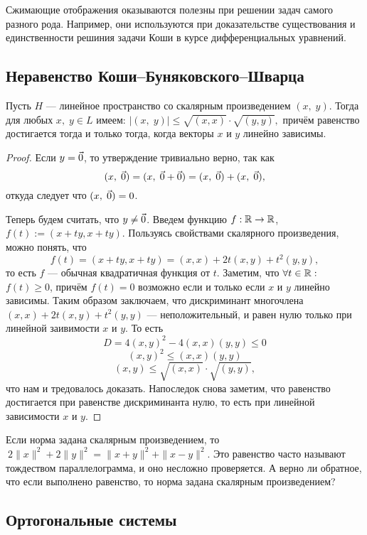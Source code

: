 Сжимающие отображения оказываются полезны при решении задач самого разного рода. Например, они используются при доказательстве существования и единственности решиния задачи Коши в курсе дифференциальных уравнений. 

\subsection{Неравенство Коши--Буняковского--Шварца}

\begin{Theorem}
	Пусть $H$ --- линейное пространство со скалярным произведением $(x,\;y)$.
	Тогда для любых $x,\;y\in L$ имеем: $|( x,\;y) | \leqslant  \sqrt{(x, x)}\cdot \sqrt{(y, y)},$ причём равенство достигается тогда и только тогда, когда векторы $x$ и $y$ линейно зависимы.
\end{Theorem}
\begin{proof}
	Если $y = \vec{0}$, то утверждение тривиально верно, так как $$ ( x,\;\vec{0}) = ( x,\;\vec{0}+\vec{0}) = ( x,\;\vec{0})+( x,\;\vec{0}),$$
	откуда следует что $( x,\;\vec{0}) = 0$.
	
	Теперь будем считать, что $y\neq \vec{0}$. Введем функцию $f: \mathbb{R} \rightarrow\mathbb{R}$, $f(t):=(x+ty, x+ty)$. Пользуясь свойствами скалярного произведения, можно понять, что 
    $$ f(t) =(x+ty, x+ty) = (x, x)+2t(x, y)+t^2(y, y),$$ 
    то есть $f$ --- обычная квадратичная функция от $t$. Заметим, что $\forall t\in\mathbb{R}:$ $f(t)\geq0$, причём $f(t)=0$ возможно если и только если $x$ и $y$ линейно зависимы. Таким образом заключаем, что дискриминант многочлена $(x, x)+2t(x, y)+t^2(y, y)$ --- неположительный, и равен нулю только при линейной заивимости $x$ и $y$. То есть 
	\[D = 4(x, y)^2-4(x, x)(y, y)\leq 0\]
	\[(x, y)^2\leq(x, x)(y, y)\]
	\[(x, y)\leq \sqrt{(x, x)}\cdot \sqrt{(y, y)},\]
	что нам и тредовалось доказать. Напоследок снова заметим, что равенство достигается при равенстве дискриминанта нулю, то есть при линейной зависимости $x$ и $y$.
\end{proof}
\begin{Task}
	Если норма задана скалярным произведением, то 
	$\ 2\|x\|^2+2\|y\|^2=\|x+y\|^2+\|x-y\|^2$. Это равенство часто называют тождеством параллелограмма, и оно несложно проверяется. А верно ли обратное, что если выполнено равенство, то норма задана скалярным произведением?
\end{Task}

\subsection{Ортогональные системы}



